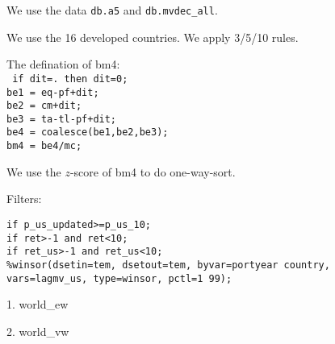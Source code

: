 % 

\usepackage[T1]{fontenc}




\thispagestyle{fancy}

\newcommand{\code}{\texttt}
\newcommand*{\Commonpath}{20190226/bm-developed}


We use the data \code{db.a5} and \code{db.mvdec\_all}. 

We use the 16 developed countries.
We apply 3/5/10 rules.

The defination of bm4:\\
\code{
if dit=. then dit=0;\\
be1 = eq-pf+dit;\\
be2 = cm+dit;\\
be3 = ta-tl-pf+dit;\\
be4 = coalesce(be1,be2,be3);\\
bm4 = be4/mc;\\
}

We use the $z$-score of bm4 to do one-way-sort.


Filters:

\code{if p\_us\_updated>=p\_us\_10;} \\
\code{if ret>-1 and ret<10;} \\
\code{if ret\_us>-1 and ret\_us<10;} \\
\code{\%winsor(dsetin=tem, dsetout=tem, byvar=portyear country, vars=lagmv\_us, type=winsor, pctl=1 99);}

\small


1. world\_ew


2. world\_vw





